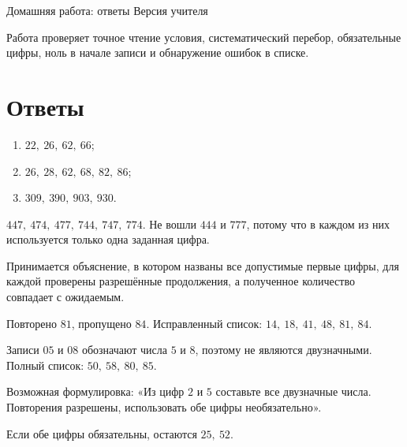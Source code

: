 \worksheettitle
  {Домашняя работа: ответы}
  { Версия учителя}

\begin{teacherbox}[Назначение]
  Работа проверяет точное чтение условия, систематический перебор, обязательные
  цифры, ноль в начале записи и обнаружение ошибок в списке.
\end{teacherbox}

\section{Ответы}

\begin{teacherbox}
  \begin{enumerate}
    \item \(22,\ 26,\ 62,\ 66\);
    \item \(26,\ 28,\ 62,\ 68,\ 82,\ 86\);
    \item \(309,\ 390,\ 903,\ 930\).
  \end{enumerate}
\end{teacherbox}

\begin{teacherbox}
  \(447,\ 474,\ 477,\ 744,\ 747,\ 774\). Не вошли \(444\) и \(777\), потому
  что в каждом из них используется только одна заданная цифра.
\end{teacherbox}

\begin{teacherbox}[3. Доказательство]
  Принимается объяснение, в котором названы все допустимые первые цифры, для
  каждой проверены разрешённые продолжения, а полученное количество совпадает
  с ожидаемым.
\end{teacherbox}

\newpage
\begin{teacherbox}
  Повторено \(81\), пропущено \(84\). Исправленный список:
  \(14,\ 18,\ 41,\ 48,\ 81,\ 84\).
\end{teacherbox}

\begin{teacherbox}
  Записи \(05\) и \(08\) обозначают числа \(5\) и \(8\), поэтому не являются
  двузначными. Полный список: \(50,\ 58,\ 80,\ 85\).
\end{teacherbox}

\begin{teacherbox}
  Возможная формулировка: «Из цифр \(2\) и \(5\) составьте все двузначные
  числа. Повторения разрешены, использовать обе цифры необязательно».

  Если обе цифры обязательны, остаются \(25,\ 52\).
\end{teacherbox}

